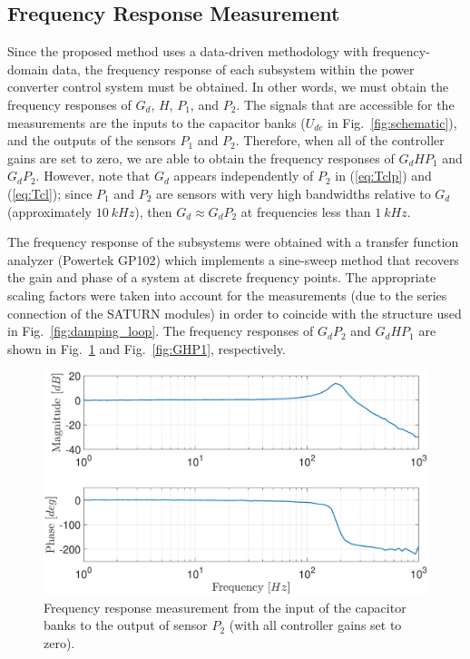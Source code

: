 \documentclass[a4paper, 10pt, conference]{ieeeconf}
\begin{document}
\subsection{Frequency Response Measurement}
Since the proposed method uses a data-driven methodology with frequency-domain data, the frequency response of each subsystem within the power converter control system must be obtained. In other words, we must obtain the frequency responses of $G_d$, $H$, $P_1$, and $P_2$. The signals that are accessible for the measurements are the inputs to the capacitor banks ($U_{dc}$ in Fig.~\ref{fig:schematic}), and the outputs of the sensors $P_1$ and $P_2$. Therefore, when all of the controller gains are set to zero, we are able to obtain the frequency responses of $G_dHP_1$ and $G_dP_2$. However, note that $G_d$ appears independently of $P_2$ in (\ref{eq:Tclp}) and (\ref{eq:Tcl}); since $P_1$ and $P_2$ are sensors with very high bandwidths relative to $G_d$ (approximately $10 \: kHz$), then $G_d \approx G_dP_2$  at frequencies less than $1 \: kHz$. 

The frequency response of the subsystems were obtained with a transfer function analyzer (Powertek GP102) which implements a sine-sweep method that recovers the gain and phase of a system at discrete frequency points. The appropriate scaling factors were taken into account for the measurements (due to the series connection of the SATURN modules) in order to coincide with the structure used in Fig.~\ref{fig:damping_loop}. The frequency responses of $G_dP_2$ and $G_dHP_1$ are shown in Fig.~\ref{fig:G} and Fig.~\ref{fig:GHP1}, respectively.

\begin{figure}
\centering
\includegraphics[width=\columnwidth]{../pics/G.eps}
\caption{Frequency response measurement from the input of the capacitor banks to the output of sensor $P_2$ (with all controller gains set to zero).}
\label{fig:G}
\end{figure} 
\end{document}

